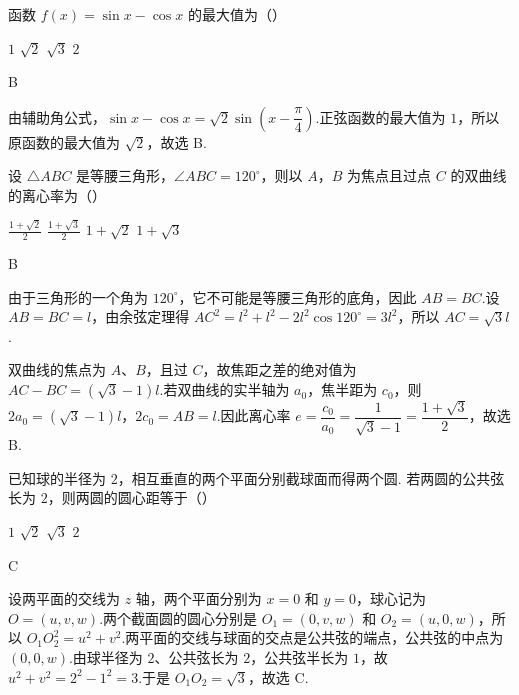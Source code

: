 \begin{problem}
函数 \( f(x) = \sin x - \cos x \) 的最大值为（\quad）

\choices
    {\(1\)}
    {\(\sqrt{2}\)}
    {\(\sqrt{3}\)}
    {\(2\)}
\end{problem}

\begin{answer}
B
\end{answer}

\begin{solution}
由辅助角公式，\(\sin x-\cos x=\sqrt2\sin\left(x-\dfrac\pi4\right)\).正弦函数的最大值为 \(1\)，所以原函数的最大值为 \(\sqrt2\)，故选 B.
\end{solution}

\begin{problem}
设 \(\triangle ABC\) 是等腰三角形，\(\angle ABC = 120^{\circ}\)，则以 \(A\)，\(B\) 为焦点且过点 \(C\) 的双曲线的离心率为（\quad）

\choices
    {\(\frac{1 + \sqrt{2}}{2}\)}
    {\(\frac{1 + \sqrt{3}}{2}\)}
    {\(1 + \sqrt{2}\)}
    {\(1 + \sqrt{3}\)}
\end{problem}

\begin{answer}
B
\end{answer}

\begin{solution}
由于三角形的一个角为 \(120^{\circ}\)，它不可能是等腰三角形的底角，因此 \(AB=BC\).设 \(AB=BC=l\)，由余弦定理得
\(AC^2=l^2+l^2-2l^2\cos120^{\circ}=3l^2\)，所以 \(AC=\sqrt3l\).

双曲线的焦点为 \(A\)、\(B\)，且过 \(C\)，故焦距之差的绝对值为 \(AC-BC=(\sqrt3-1)l\).若双曲线的实半轴为 \(a_0\)，焦半距为 \(c_0\)，则 \(2a_0=(\sqrt3-1)l\)，\(2c_0=AB=l\).因此离心率
\(e=\dfrac{c_0}{a_0}=\dfrac{1}{\sqrt3-1}=\dfrac{1+\sqrt3}{2}\)，故选 B.
\end{solution}

\begin{problem}
已知球的半径为 \(2\)，相互垂直的两个平面分别截球面而得两个圆. 若两圆的公共弦长为 \(2\)，则两圆的圆心距等于（\quad）

\choices
    {\(1\)}
    {\(\sqrt{2}\)}
    {\(\sqrt{3}\)}
    {\(2\)}
\end{problem}

\begin{answer}
C
\end{answer}

\begin{solution}
设两平面的交线为 \(z\) 轴，两个平面分别为 \(x=0\) 和 \(y=0\)，球心记为 \(O=(u,v,w)\).两个截面圆的圆心分别是 \(O_1=(0,v,w)\) 和 \(O_2=(u,0,w)\)，所以
\(O_1O_2^2=u^2+v^2\).两平面的交线与球面的交点是公共弦的端点，公共弦的中点为 \((0,0,w)\).由球半径为 \(2\)、公共弦长为 \(2\)，公共弦半长为 \(1\)，故
\(u^2+v^2=2^2-1^2=3\).于是 \(O_1O_2=\sqrt3\)，故选 C.
\end{solution}

